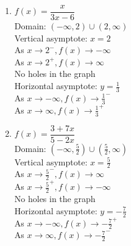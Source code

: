 \begin{multicols}{2}
\begin{enumerate} 
\setcounter{enumi}{\value{HW}}

\item $f(x) = \dfrac{x}{3x - 6}$ \\ 
Domain: $(-\infty, 2) \cup (2, \infty)$\\
Vertical asymptote: $x = 2$\\
As $x \rightarrow 2^{-}, f(x) \rightarrow -\infty$\\
As $x \rightarrow 2^{+}, f(x) \rightarrow \infty$\\
No holes in the graph\\
Horizontal asymptote: $y = \frac{1}{3}$ \\
As $x \rightarrow -\infty, f(x) \rightarrow \frac{1}{3}^{-}$\\
As $x \rightarrow \infty, f(x) \rightarrow \frac{1}{3}^{+}$\\

\vfill

\columnbreak

\item $f(x) = \dfrac{3 + 7x}{5 - 2x}$\\
Domain: $(-\infty, \frac{5}{2}) \cup (\frac{5}{2}, \infty)$\\
Vertical asymptote: $x = \frac{5}{2}$\\
As $x \rightarrow \frac{5}{2}^{-}, f(x) \rightarrow \infty$\\
As $x \rightarrow \frac{5}{2}^{+}, f(x) \rightarrow -\infty$\\
No holes in the graph\\
Horizontal asymptote: $y = -\frac{7}{2}$ \\
As $x \rightarrow -\infty, f(x) \rightarrow -\frac{7}{2}^{+}$\\
As $x \rightarrow \infty, f(x) \rightarrow -\frac{7}{2}^{-}$\\

\setcounter{HW}{\value{enumi}}
\end{enumerate}
\end{multicols}


